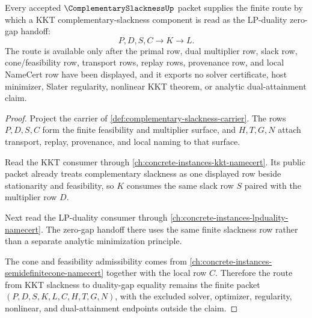 \begin{theorem}
\label{thm:complementary-slackness-kkt-duality-gap-route}
Every accepted $\ComplementarySlacknessUp$ packet supplies the finite route by which a KKT complementary-slackness component is read as the LP-duality zero-gap handoff:
$$
P,D,S,C \longrightarrow K \longrightarrow L .
$$
The route is available only after the primal row, dual multiplier row, slack row, cone/feasibility row, transport rows, replay rows, provenance row, and local NameCert row have been displayed, and it exports no solver certificate, host minimizer, Slater regularity, nonlinear KKT theorem, or analytic dual-attainment claim.
\end{theorem}
\begin{proof}
Project the carrier of \autoref{def:complementary-slackness-carrier}. The rows $P,D,S,C$ form the finite feasibility and multiplier surface, and $H,T,G,N$ attach transport, replay, provenance, and local naming to that surface.

Read the KKT consumer through \autoref{ch:concrete-instances-kkt-namecert}. Its public packet already treats complementary slackness as one displayed row beside stationarity and feasibility, so $K$ consumes the same slack row $S$ paired with the multiplier row $D$.

Next read the LP-duality consumer through \autoref{ch:concrete-instances-lpduality-namecert}. The zero-gap handoff there uses the same finite slackness row rather than a separate analytic minimization principle.

The cone and feasibility admissibility comes from \autoref{ch:concrete-instances-semidefinitecone-namecert} together with the local row $C$. Therefore the route from KKT slackness to duality-gap equality remains the finite packet $(P,D,S,K,L,C,H,T,G,N)$, with the excluded solver, optimizer, regularity, nonlinear, and dual-attainment endpoints outside the claim.
\end{proof}


